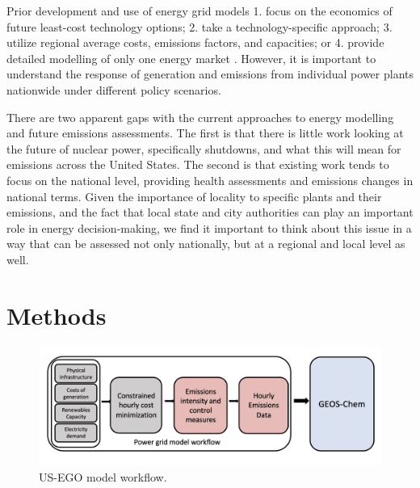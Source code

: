 \documentclass[12]{article}
\begin{document}
Prior development and use of energy grid models 1. focus on the economics of future least-cost technology options; 2. take a technology-specific approach; 3. utilize regional average costs, emissions factors, and capacities; or 4. provide detailed modelling of only one energy market \citep{jenkins_enhanced_2017, epa_ipm_2018}. However, it is important to understand the response of generation and emissions from individual power plants nationwide under different policy scenarios. 

There are two apparent gaps with the current approaches to energy modelling and future emissions assessments. The first is that there is little work looking at the future of nuclear power, specifically shutdowns, and what this will mean for emissions across the United States. The second is that existing work tends to focus on the national level, providing health assessments and emissions changes in national terms. Given the importance of locality to specific plants and their emissions, and the fact that local state and city authorities can play an important role in energy decision-making, we find it important to think about this issue in a way that can be assessed not only nationally, but at a regional and local level as well. 


\section{Methods}

\begin{figure}[!htb]
    \centering 
    \includegraphics[scale = .5]{US_EGO_flow.png}
    \caption{US-EGO model workflow.}
    \label{fig:my_label}
\end{figure}
\end{document}

